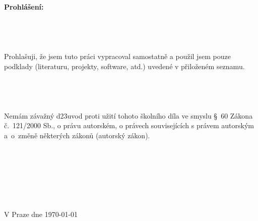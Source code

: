 \null\vfill \thispagestyle{empty}
{\bf Prohl\' a\v sen\' i:} \\
\\
\\
\\
\\
Prohla\v suji, \v ze jsem tuto pr\' aci vypracoval samostatn\v e
a pou\v zil jsem pouze podklady (literaturu, projekty, software, atd.) uveden\' e
v p\v rilo\v zen\' em seznamu. \\
\\
\\
\\
\\
Nem\' am z\' ava\v zn\'y d\accent23uvod proti u\v zit\' i tohoto \v skoln\' iho d\' ila ve smyslu \S\ 60
Z\' akona \v c.\ 121/2000 Sb., o pr\' avu autorsk\' em, o pr\' avech souvisej\' ic\' ich
s pr\' avem autorsk\' ym a~o~zm\v en\v e n\v ekter\' ych z\'akon\r u (autorsk\'y z\' akon). \\ 
\\
\\
\\
\\
\\
\\
\\
{V Praze dne \czechdate\today}\hfill \myself
%
%
%
%
%
%
\newpage



